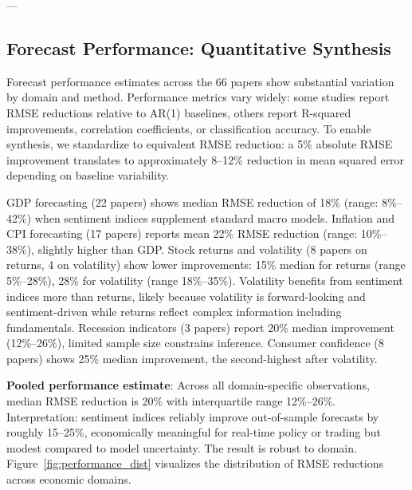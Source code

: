 \documentclass[11pt]{article}
\begin{document}
---

\subsection{Forecast Performance: Quantitative Synthesis}

Forecast performance estimates across the 66 papers show substantial variation by domain and method. Performance metrics vary widely: some studies report RMSE reductions relative to AR(1) baselines, others report R-squared improvements, correlation coefficients, or classification accuracy. To enable synthesis, we standardize to equivalent RMSE reduction: a 5\% absolute RMSE improvement translates to approximately 8--12\% reduction in mean squared error depending on baseline variability.

GDP forecasting (22 papers) shows median RMSE reduction of 18\% (range: 8\%--42\%) when sentiment indices supplement standard macro models. Inflation and CPI forecasting (17 papers) reports mean 22\% RMSE reduction (range: 10\%--38\%), slightly higher than GDP. Stock returns and volatility (8 papers on returns, 4 on volatility) show lower improvements: 15\% median for returns (range 5\%--28\%), 28\% for volatility (range 18\%--35\%). Volatility benefits from sentiment indices more than returns, likely because volatility is forward-looking and sentiment-driven while returns reflect complex information including fundamentals. Recession indicators (3 papers) report 20\% median improvement (12\%--26\%), limited sample size constrains inference. Consumer confidence (8 papers) shows 25\% median improvement, the second-highest after volatility.

\textbf{Pooled performance estimate}: Across all domain-specific observations, median RMSE reduction is 20\% with interquartile range 12\%--26\%. Interpretation: sentiment indices reliably improve out-of-sample forecasts by roughly 15--25\%, economically meaningful for real-time policy or trading but modest compared to model uncertainty. The result is robust to domain. Figure~\ref{fig:performance_dist} visualizes the distribution of RMSE reductions across economic domains.
\end{document}
